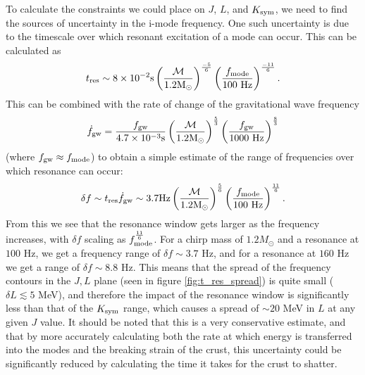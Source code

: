 \documentclass[fleqn,usenatbib]{mnras}
\begin{document}
To calculate the constraints we could place on $J$, $L$, and $K_{\rm sym}$, we need to find the sources of uncertainty in the i-mode frequency. One such uncertainty is due to the timescale over which resonant excitation of a mode can occur. This can be calculated as \citep{tsang2012resonant}
\begin{align}
t_{\rm res}\sim 8\times10^{-2}\text{s}\left(\frac{\mathcal{M}}{1.2\text{M}_{\odot}}\right)^{\frac{-5}{6}}\left(\frac{f_{\rm mode}}{100 \text{ Hz}}\right)^{\frac{-11}{6}}.
\label{eq:res_timescale}    
\end{align}
\noindent This can be combined with the rate of change of the gravitational wave frequency
\begin{align}
\Dot{f}_{\rm gw}=\frac{f_{\rm gw}}{4.7\times10^{-3}\text{s}}\left(\frac{\mathcal{M}}{1.2\text{M}_{\odot}}\right)^{\frac{5}{3}}\left(\frac{f_{\rm gw}}{1000 \text{ Hz}}\right)^{\frac{8}{3}}
\label{eq:df_GW/dt}    
\end{align}
\noindent (where $f_{\rm gw}\approx f_{\rm mode}$) to obtain a simple estimate of the range of frequencies over which resonance can occur:
\begin{align}
\delta f\sim t_{\rm res}\Dot{f}_{\rm gw}\sim3.7\text{Hz}\left(\frac{\mathcal{M}}{1.2\text{M}_{\odot}}\right)^{\frac{5}{6}}\left(\frac{f_{\rm mode}}{100 \text{ Hz}}\right)^{\frac{11}{6}}.
\label{eq:freq_spread}    
\end{align}
\noindent From this we see that the resonance window gets larger as the frequency increases, with $\delta f$ scaling as $f_{\rm mode}^{\frac{11}{6}}$. For a chirp mass of $1.2M_{\odot}$ and a resonance at $100$ Hz, we get a frequency range of $\delta f\sim 3.7$ Hz, and for a resonance at $160$ Hz we get a range of $\delta f\sim 8.8$ Hz. This means that the spread of the frequency contours in the $J,L$ plane (seen in figure \ref{fig:t_res_spread}) is quite small ($\delta L\lesssim 5$ MeV), and therefore the impact of the resonance window is significantly less than that of the $K_{\rm sym}$ range, which causes a spread of $\sim 20$ MeV in $L$ at any given $J$ value. It should be noted that this is a very conservative estimate, and that by more accurately calculating both the rate at which energy is transferred into the modes and the breaking strain of the crust, this uncertainty could be significantly reduced by calculating the time it takes for the crust to shatter.
\end{document}
